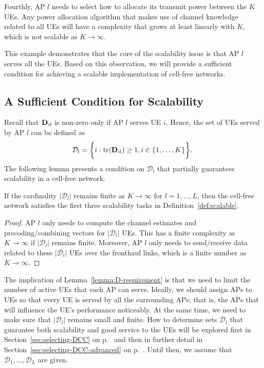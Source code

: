 Fourthly, AP $l$ needs to select how to allocate its transmit power between the $K$ UEs. Any power allocation algorithm that makes use of channel knowledge related to all UEs will have a complexity that grows at least linearly with $K$, which is not scalable as $K \to \infty$. 

This example demonstrates that the core of the scalability issue is that AP $l$ serves all the UEs. Based on this observation, we will provide a sufficient condition for achieving a scalable implementation of cell-free networks.

\subsection{A Sufficient Condition for Scalability}

Recall that $\mathbf{D}_{il}$ is non-zero only if AP $l$ serves UE $i$. Hence, the set of \glspl{UE} served by AP $l$ can be defined as
\begin{equation}\label{eq:definition-of-the-set-D_l}
\mathcal{D}_l = \bigg\{ i : \mathrm{tr}(\mathbf{D}_{il})\geq 1, i \in \{ 1, \ldots, K \} \bigg\}.
\end{equation}
The following lemma presents a condition on $\mathcal{D}_l$ that partially guarantees scalability in a cell-free network.

\begin{lemma} \label{lemma:D-requirement}
	If the cardinality $|\mathcal{D}_l |$ remains finite as $K \to \infty$ for $l=1,\ldots,L$, then the cell-free network satisfies the first three scalability tasks in Definition~\ref{def:scalable}.
\end{lemma}
\begin{proof}
	\gls{AP} $l$ only needs to compute the channel estimates and precoding/combining vectors for $|\mathcal{D}_l |$ \glspl{UE}. This has a finite complexity as $K \to \infty$ if $|\mathcal{D}_l |$ remains finite. Moreover, \gls{AP} $l$ only needs to send/receive data related to these $|\mathcal{D}_l |$ \glspl{UE} over the fronthaul links, which is a finite number as $K \to \infty$.
\end{proof}

The implication of Lemma~\ref{lemma:D-requirement} is that we need to limit the number of active UEs that each AP can serve. Ideally, we should assign APs to UEs so that every UE is served by all the surrounding APs; that is, the APs that will influence the UE's performance noticeably. At the same time, we need to make sure that $|\mathcal{D}_l |$ remains small and finite. How to determine sets $\mathcal{D}_l$ that guarantee both scalability and good service to the \glspl{UE} will be explored first in Section~\ref{sec:selecting-DCC} on p.~\pageref{sec:selecting-DCC} and then in further detail in Section~\ref{sec:selecting-DCC-advanced} on p.~\pageref{sec:selecting-DCC-advanced}. Until then, we  assume that $\mathcal{D}_1,\ldots,\mathcal{D}_L$ are given.

